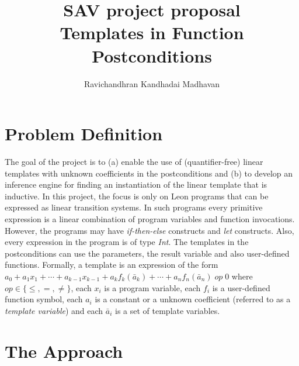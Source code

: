 \documentclass[a4paper,10pt]{article}
\begin{document}
\title{SAV project proposal \\ Templates in Function Postconditions}
\author{Ravichandhran Kandhadai Madhavan}
\maketitle

\newcommand{\dash}[1]{\overline{#1}}

\section{Problem Definition}

The goal of the project is to (a) enable the use of (quantifier-free) linear templates with unknown coefficients in the postconditions and (b) to develop an inference engine for finding an instantiation of the linear template that is inductive. In this project, the focus is only on Leon programs that can be expressed as linear transition systems. In such programs every primitive expression is a linear combination of program variables and function invocations. However, the programs may have \textit{if-then-else} constructs and \textit{let} constructs. Also, every expression in the program is of type \textit{Int}.
The templates in the postconditions can use the parameters, the result variable and also user-defined functions. Formally, a template is an expression of the form $a_0 + a_1x_1 + \cdots + a_{k-1}x_{k-1} + a_kf_k(\bar{a}_k) + \cdots + a_nf_n(\bar{a}_n) \; op \; 0$ where $op \in \{\le, =, \ne \}$, each $x_i$ is a program variable, each $f_i$ is a user-defined function symbol, each $a_i$ is a constant or a unknown coefficient (referred to as a \textit{template variable}) and each $\bar{a}_i$ is a set of template variables.

\section{The Approach}
\end{document}
